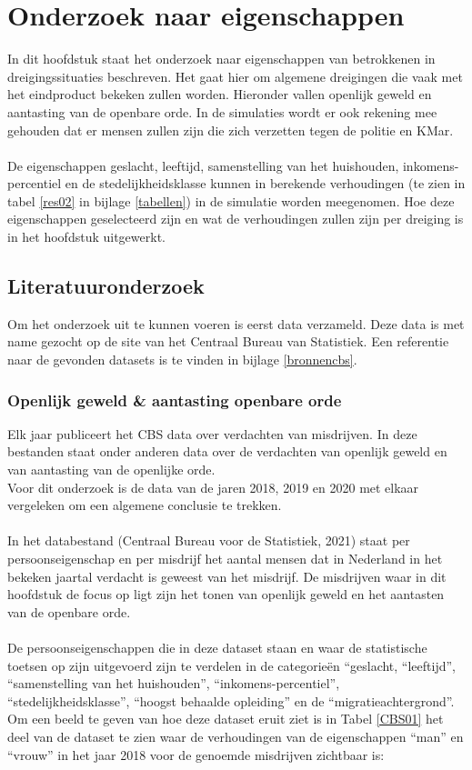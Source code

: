 \documentclass[12pt, letterpaper]{article}
\begin{document}
\newpage
\section{Onderzoek naar eigenschappen} \label{Heigenschappen}
In dit hoofdstuk staat het onderzoek naar eigenschappen van betrokkenen in dreigingssituaties beschreven. Het gaat hier om algemene dreigingen die vaak met het eindproduct bekeken zullen worden. Hieronder vallen openlijk geweld en aantasting van de openbare orde. In de simulaties wordt er ook rekening mee gehouden dat er mensen zullen zijn die zich verzetten tegen de politie en KMar. \\ \\
De eigenschappen geslacht, leeftijd, samenstelling van het huishouden, inkomens-percentiel en de stedelijkheidsklasse kunnen in berekende verhoudingen (te zien in tabel \ref{res02} in bijlage \ref{tabellen}) in de simulatie worden meegenomen. Hoe deze eigenschappen geselecteerd zijn en wat de verhoudingen zullen zijn per dreiging is in het hoofdstuk uitgewerkt.

\subsection{Literatuuronderzoek}
Om het onderzoek uit te kunnen voeren is eerst data verzameld. Deze data is met name gezocht op de site van het Centraal Bureau van Statistiek. Een referentie naar de gevonden datasets is te vinden in bijlage \ref{bronnencbs}.

\subsubsection{Openlijk geweld \& aantasting openbare orde} \label{dataset1}
Elk jaar publiceert het CBS data over verdachten van misdrijven. In deze bestanden staat onder anderen data over de verdachten van openlijk geweld en van aantasting van de openlijke orde. \\
Voor dit onderzoek is de data van de jaren 2018, 2019 en 2020 met elkaar vergeleken om een algemene conclusie te trekken. \\ \\
In het databestand (Centraal Bureau voor de Statistiek, 2021) staat per persoonseigenschap en per misdrijf het aantal mensen dat in Nederland in het bekeken jaartal verdacht is geweest van het misdrijf. De misdrijven waar in dit hoofdstuk de focus op ligt zijn het tonen van openlijk geweld en het aantasten van de openbare orde. \\ \\
De persoonseigenschappen die in deze dataset staan en waar de statistische toetsen op zijn uitgevoerd zijn te verdelen in de categorieën ``geslacht, ``leeftijd'', ``samenstelling van het huishouden'', ``inkomens-percentiel'', ``stedelijkheidsklasse'', ``hoogst behaalde opleiding'' en de ``migratieachtergrond''. \\
Om een beeld te geven van hoe deze dataset eruit ziet is in Tabel \ref{CBS01} het deel van de dataset te zien waar de verhoudingen van de eigenschappen ``man'' en ``vrouw'' in het jaar 2018 voor de genoemde misdrijven zichtbaar is:
\end{document}
